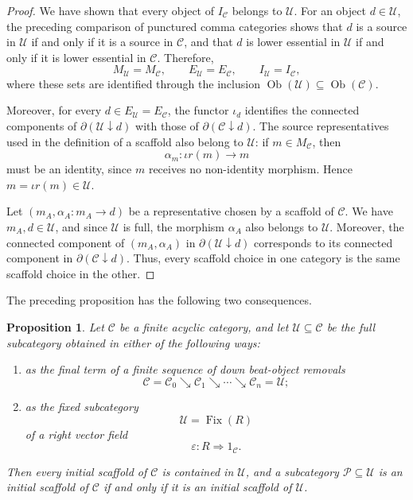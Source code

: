 \documentclass[12pt]{amsart}
\newtheorem{proposition}[teo]{Proposition}
\theoremstyle{definition}
\theoremstyle{remark}
\numberwithin{figure}{section}%
\newcommand{\CC}{\mathcal{C}}
\newcommand{\Uc}{\mathcal{U}}
\begin{document}
\begin{proof}
We have shown that every object of \(I_\CC\) belongs to \(\Uc\). For an
object \(d\in\Uc\), the preceding comparison of punctured comma
categories shows that \(d\) is a source in \(\Uc\) if and only if it is a
source in \(\CC\), and that \(d\) is lower essential in \(\Uc\) if and
only if it is lower essential in \(\CC\). Therefore,
\[
M_\Uc=M_\CC,
\qquad
E_\Uc=E_\CC,
\qquad
I_\Uc=I_\CC,
\]
where these sets are identified through the inclusion
\(\operatorname{Ob}(\Uc)\subseteq\operatorname{Ob}(\CC)\).

Moreover, for every \(d\in E_\Uc=E_\CC\), the functor \(\iota_d\)
identifies the connected components of
\(\partial(\Uc\downarrow d)\) with those of
\(\partial(\CC\downarrow d)\). The source representatives used in the
definition of a scaffold also belong to \(\Uc\): if
\(m\in M_\CC\), then
\[
\alpha_m\colon\iota r(m)\longrightarrow m
\]
must be an identity, since \(m\) receives no non-identity morphism.
Hence \(m=\iota r(m)\in\Uc\).

Let
\(
(m_A,\alpha_A\colon m_A\to d)
\)
be a representative chosen by a scaffold of \(\CC\). We have
\(m_A,d\in\Uc\), and since \(\Uc\) is full, the morphism
\(\alpha_A\) also belongs to \(\Uc\). Moreover, the connected component of
\((m_A,\alpha_A)\) in \(\partial(\Uc\downarrow d)\) corresponds to its
connected component in \(\partial(\CC\downarrow d)\). Thus, every scaffold choice in one category is the same scaffold choice in the other.
\end{proof}

The preceding proposition has the following two consequences.
\begin{proposition}\label{prop:scaffold_invariance_consequences}
Let \(\CC\) be a finite acyclic category, and let
\(\Uc\subseteq\CC\) be the full subcategory obtained in either of the
following ways:

\begin{enumerate}
    \item as the final term of a finite sequence of down beat-object
    removals
    \[
    \CC=\CC_0
    \searrow
    \CC_1
    \searrow
    \cdots
    \searrow
    \CC_n=\Uc;
    \]

    \item as the fixed subcategory
    \[
    \Uc=\operatorname{Fix}(R)
    \]
    of a right vector field
    \[
    \varepsilon\colon R\Rightarrow1_\CC.
    \]
\end{enumerate}

Then every initial scaffold of \(\CC\) is contained in \(\Uc\), and a
subcategory \(\mathcal{P}\subseteq\Uc\) is an initial scaffold of \(\CC\) if and
only if it is an initial scaffold of \(\Uc\).
\end{proposition}
\end{document}
